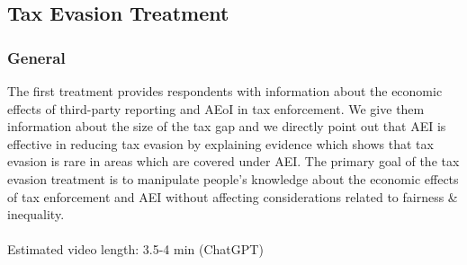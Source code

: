 \documentclass[11pt]{article}
\begin{document}
\subsection{Tax Evasion Treatment}
\subsubsection*{General}
The first treatment provides respondents with information about the economic effects of third-party reporting and AEoI in tax enforcement. We give them information about the size of the tax gap and we directly point out that AEI is effective in reducing tax evasion by explaining evidence which shows that tax evasion is rare in areas which are covered under AEI. The primary goal of the tax evasion treatment is to manipulate people’s knowledge about the economic effects of tax enforcement and AEI without affecting considerations related to fairness \& inequality. \\ \\  
Estimated video length: 3.5-4 min (ChatGPT)
\end{document}
